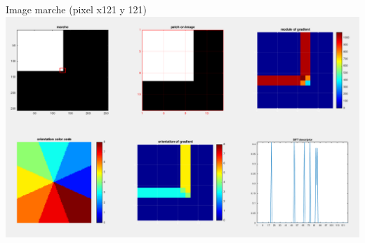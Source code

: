 \documentclass[a4paper]{article}
\begin{document}
Image marche (pixel x121 y 121)\\
\includegraphics[width=\textwidth]{marche_121_121}\\
\end{document}
